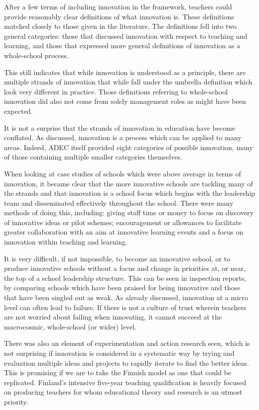 After a few terms of including innovation in the framework, teachers could provide reasonably clear definitions of what innovation is. These definitions matched closely to those given in the literature. The definitions fell into two general categories: those that discussed innovation with respect to teaching and learning, and those that expressed more general definitions of innovation as a whole-school process.

This still indicates that while innovation is understood as a principle, there are multiple strands of innovation that while fall under the umbrella definition which look very different in practice. Those definitions referring to whole-school innovation did also not come from solely management roles as might have been expected.

It is not a surprise that the strands of innovation in education have become conflated. As discussed, innovation is a process which can be applied to many areas. Indeed, ADEC itself provided eight categories of possible innovation, many of those containing multiple smaller categories themselves.

When looking at case studies of schools which were above average in terms of innovation, it became clear that the more innovative schools are tackling many of the strands and that innovation is a school focus which begins with the leadership team and disseminated effectively throughout the school. There were many methods of doing this, including: giving staff time or money to focus on discovery of innovative ideas or pilot schemes; encouragement or allowances to facilitate greater collaboration with an aim at innovative learning events and a focus on innovation within teaching and learning.

It is very difficult, if not impossible, to become an innovative school, or to produce innovative schools without a focus and change in priorities at, or near, the top of a school leadership structure. This can be seen in inspection reports, by comparing schools which have been praised for being innovative and those that have been singled out as weak. As already discussed, innovation at a micro level can often lead to failure. If there is not a culture of trust wherein teachers are not worried about failing when innovating, it cannot succeed at the macrocosmic, whole-school (or wider) level.

There was also an element of experimentation and action research seen, which is not surprising if innovation is considered in a systematic way by trying and evaluation multiple ideas and projects to rapidly iterate to find the better ideas. This is promising if we are to take the Finnish model as one that could be replicated. Finland's intensive five-year teaching qualification is heavily focused on producing teachers for whom educational theory and research is an utmost priority. 

